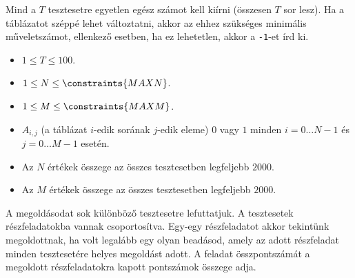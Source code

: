 \OutputFile

Mind a $T$ tesztesetre egyetlen egész számot kell kiírni (összesen $T$ sor lesz).
Ha a táblázatot széppé lehet változtatni, akkor az ehhez szükséges minimális műveletszámot, ellenkező esetben, ha ez lehetetlen, akkor a \texttt{-1}-et írd ki.


\Constraints
\begin{itemize}[nolistsep, itemsep=2mm]
  \item $1 \le T \le 100$.
  \item $1 \le N \le \constraints{MAXN}$.
  \item $1 \le M \le \constraints{MAXM}$.
  \item $A_{i, j}$ (a táblázat $i$-edik sorának $j$-edik eleme) $0$ vagy $1$ minden $i = 0\ldots N-1$ és $j = 0\ldots M-1$ esetén.
  \item Az $N$ értékek összege az összes tesztesetben legfeljebb $2000$.
  \item Az $M$ értékek összege az összes tesztesetben legfeljebb $2000$.
\end{itemize}

\Scoring
A megoldásodat sok különböző tesztesetre lefuttatjuk. A tesztesetek részfeladatokba vannak csoportosítva. Egy-egy részfeladatot akkor tekintünk megoldottnak, ha volt legalább egy olyan beadásod, amely az adott részfeladat minden tesztesetére helyes megoldást adott.
A feladat összpontszámát a megoldott részfeladatokra kapott pontszámok összege adja.





